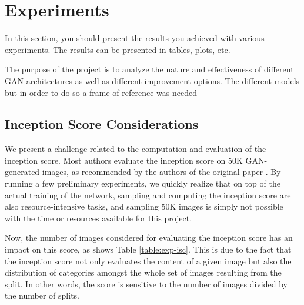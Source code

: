 
\section{Experiments} In this section, you should
present the results you achieved with various experiments. The results
can be presented in tables, plots, etc. 

The purpose of the project is to analyze the nature and effectiveness of different GAN architectures as well as different improvement options. The different models  but in order to do so a frame of reference was needed 


\subsection{Inception Score Considerations}
We present a challenge related to the computation and evaluation of the inception score. Most authors evaluate the inception score on 50K GAN-generated images, as recommended by the authors of the original paper \cite{salimans2016improved}. By running a few preliminary experiments, we quickly realize that on top of the actual training of the network, sampling and computing the inception score are also resource-intensive tasks, and sampling 50K images is simply not possible with the time or resources available for this project.

Now, the number of images considered for evaluating the inception score has an impact on this score, as shows Table \ref{table:exp-isc}. This is due to the fact that the inception score not only evaluates the content of a given image but also the distribution of categories amongst the whole set of images resulting from the split. In other words, the score is sensitive to the number of images divided by the number of splits. 

